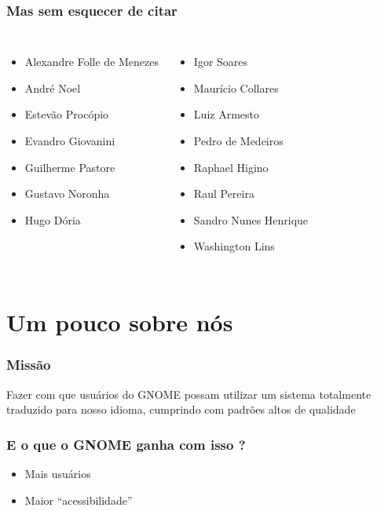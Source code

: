 \documentclass{beamer}
\begin{document}
\begin{frame}
    \frametitle{Mas sem esquecer de citar}
    \begin{columns}[c]
      \column{1.5in}
        \begin{itemize}
          \item Alexandre Folle de Menezes
          \item André Noel
          \item Estevão Procópio
          \item Evandro Giovanini
          \item Guilherme Pastore
          \item Gustavo Noronha
          \item Hugo Dória
       \end{itemize}
       \column{1.5in}
       \begin{itemize}
          \item Igor Soares
          \item Maurício Collares
          \item Luiz Armesto
          \item Pedro de Medeiros
          \item Raphael Higino
          \item Raul Pereira
          \item Sandro Nunes Henrique 
          \item Washington Lins
        \end{itemize}
    \end{columns}
\end{frame}

\section{Um pouco sobre nós}

\begin{frame}
    \frametitle{Missão}
    Fazer com que usuários do GNOME possam utilizar um sistema 
    totalmente traduzido para nosso idioma, cumprindo 
    com padrões altos de qualidade 
\end{frame}

\begin{frame}
  \frametitle{E o que o GNOME ganha com isso ?}
  \begin{itemize}
    \item Mais usuários
    \item Maior ``acessibilidade''
  \end{itemize}  
\end{frame}
\end{document}
